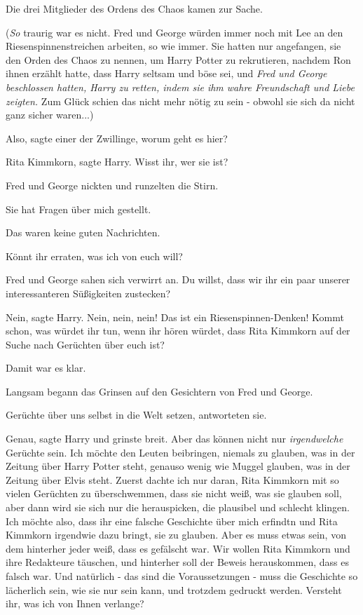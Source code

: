 Die drei Mitglieder des Ordens des Chaos kamen zur Sache.

(\emph{So} traurig war es nicht. Fred und George würden immer noch mit Lee an
den Riesenspinnenstreichen arbeiten, so wie immer. Sie hatten nur angefangen,
sie den Orden des Chaos zu nennen, um Harry Potter zu rekrutieren, nachdem Ron
ihnen erzählt hatte, dass Harry seltsam und böse sei, und \emph{Fred und George
beschlossen hatten, Harry zu retten, indem sie ihm wahre Freundschaft und Liebe
zeigten.} Zum Glück schien das nicht mehr nötig zu sein - obwohl sie sich da
nicht ganz sicher waren...)

\glqq{}Also\grqq{}, sagte einer der Zwillinge, \glqq{}worum geht es hier?\grqq{}

\glqq{}Rita Kimmkorn\grqq{}, sagte Harry. \glqq{}Wisst ihr, wer sie ist?\grqq{}

Fred und George nickten und runzelten die Stirn.

\glqq{}Sie hat Fragen über mich gestellt.\grqq{}

Das waren keine guten Nachrichten.

\glqq{}Könnt ihr erraten, was ich von euch will?\grqq{}

Fred und George sahen sich verwirrt an. \glqq{}Du willst, dass wir ihr ein paar
unserer interessanteren Süßigkeiten zustecken?\grqq{}

\glqq{}Nein\grqq{}, sagte Harry. \glqq{}Nein, nein, nein! Das ist ein
Riesenspinnen-Denken! Kommt schon, was würdet ihr tun, wenn ihr hören würdet,
dass Rita Kimmkorn auf der Suche nach Gerüchten über euch ist?\grqq{}

Damit war es klar.

Langsam begann das Grinsen auf den Gesichtern von Fred und George.

\glqq{}Gerüchte über uns selbst in die Welt setzen\grqq{}, antworteten sie.

\glqq{}Genau\grqq{}, sagte Harry und grinste breit. \glqq{}Aber das können nicht
nur \emph{irgendwelche} Gerüchte sein. Ich möchte den Leuten beibringen, niemals
zu glauben, was in der Zeitung über Harry Potter steht, genauso wenig wie Muggel
glauben, was in der Zeitung über Elvis steht. Zuerst dachte ich nur daran, Rita
Kimmkorn mit so vielen Gerüchten zu überschwemmen, dass sie nicht weiß, was sie
glauben soll, aber dann wird sie sich nur die herauspicken, die plausibel und
schlecht klingen. Ich möchte also, dass ihr eine falsche Geschichte über mich
erfindtn und Rita Kimmkorn irgendwie dazu bringt, sie zu glauben. Aber es muss
etwas sein, von dem hinterher jeder weiß, dass es gefälscht war. Wir wollen Rita
Kimmkorn und ihre Redakteure täuschen, und hinterher soll der Beweis
herauskommen, dass es falsch war. Und natürlich - das sind die Voraussetzungen -
muss die Geschichte so lächerlich sein, wie sie nur sein kann, und trotzdem
gedruckt werden. Versteht ihr, was ich von Ihnen verlange?\grqq{}

